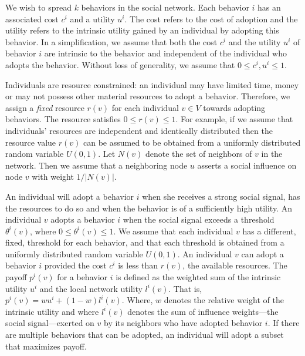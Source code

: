 \documentclass[letterpaper]{article}
\theoremstyle{plain} 		\newtheorem{thm}{Theorem}[section]
\theoremstyle{definition} 	\newtheorem{defn}[thm]{Definition}
\theoremstyle{remark}		\newtheorem{rem}{Remark}
\begin{document}
We wish to spread $k$ behaviors in the social network. Each behavior $i$ has an associated cost $c^i$ and a utility $u^i$. The cost refers to the cost of adoption and the utility refers to the intrinsic utility gained by an individual by adopting this behavior. In a simplification, we assume that both the cost $c^i$ and the utility $u^i$ of behavior $i$ are intrinsic to the behavior and independent of the individual who adopts the behavior. Without loss of generality, we assume that $0 \leq c^i, u^i \leq 1$.

Individuals are resource constrained: an individual may have limited time, money or may not possess other material resources to adopt a behavior. Therefore, we assign a \textit{fixed} resource $r(v)$ for each individual $v \in V$ towards adopting behaviors. The resource satisfies $0 \leq r(v) \leq 1$. For example, if we assume that individuals' resources are independent and identically distributed then the resource value $r(v)$ can be assumed to be obtained from a uniformly distributed random variable $U(0,1)$.  Let $N(v)$ denote the set of neighbors of $v$ in the network. Then we assume that a neighboring node $u$ asserts a social influence on node $v$ with weight $1/|N(v)|$.  

An individual will adopt a behavior $i$ when she receives a strong social signal, has the resources to do so and when the behavior is of a sufficiently high utility.  An individual $v$ adopts a behavior $i$ when the social signal exceeds a threshold $\theta^i(v)$, where $0 \leq \theta^i(v) \leq 1$. We assume that each individual $v$ has a different, fixed, threshold for each behavior, and that each threshold is obtained from a uniformly distributed random variable $U(0,1)$.  An individual $v$ can adopt a behavior $i$ provided the cost $c^i$ is less than $r(v)$, the available resources. The payoff $p^i(v)$ for a behavior $i$ is defined as the weighted sum of the intrinsic utility $u^i$ and the local network utility $l^i(v)$. That is, $p^i(v) = wu^i + (1 - w)l^i(v)$. Where, $w$ denotes the relative weight of the intrinsic utility and where $l^i(v)$ denotes the sum of influence weights---the social signal---exerted on $v$ by its neighbors who have adopted behavior $i$. If there are multiple behaviors that can be adopted, an individual will adopt a subset that maximizes payoff. 
\end{document}

